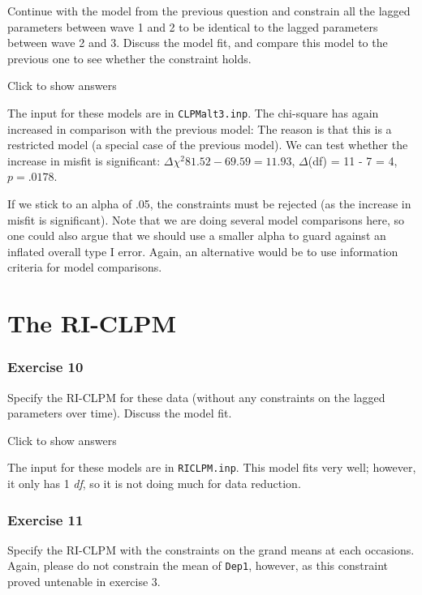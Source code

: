 \documentclass[
]{book}
\begin{document}
Continue with the model from the previous question and constrain all the lagged parameters between wave 1 and 2 to be identical to the lagged parameters between wave 2 and 3. Discuss the model fit, and compare this model to the previous one to see whether the constraint holds.

Click to show answers

The input for these models are in \texttt{CLPMalt3.inp}. The chi-square has again increased in comparison with the previous model: The reason is that this is a restricted model (a special case of the previous model). We can test whether the increase in misfit is significant: \(\Delta\chi^{2} 81.52 - 69.59 = 11.93\), \(\Delta\)(df) = 11 - 7 = 4, \(p = .0178\).

If we stick to an alpha of .05, the constraints must be rejected (as the increase in misfit is significant). Note that we are doing several model comparisons here, so one could also argue that we should use a smaller alpha to guard against an inflated overall type I error. Again, an alternative would be to use information criteria for model comparisons.

\hypertarget{the-ri-clpm}{%
\section*{The RI-CLPM}\label{the-ri-clpm}}

\hypertarget{exercise-10}{%
\subsubsection*{Exercise 10}\label{exercise-10}}

Specify the RI-CLPM for these data (without any constraints on the lagged parameters over time). Discuss the model fit.

Click to show answers

The input for these models are in \texttt{RICLPM.inp}. This model fits very well; however, it only has 1 \emph{df}, so it is not doing much for data reduction.

\hypertarget{exercise-11}{%
\subsubsection*{Exercise 11}\label{exercise-11}}

Specify the RI-CLPM with the constraints on the grand means at each occasions. Again, please do not constrain the mean of \texttt{Dep1}, however, as this constraint proved untenable in exercise 3.
\end{document}
